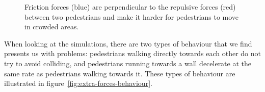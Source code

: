 \begin{figure}[hb]
    \centering
    \caption[Friction forces]{Friction forces (blue) are perpendicular to the 
    repulsive forces (red) between two pedestrians and make it harder for 
    pedestrians to move in crowded areas.}
    \label{fig:friction}
\end{figure}

When looking at the simulations, there are two types of behaviour that we find 
presents us with problems: pedestrians walking directly towards each other do 
not try to avoid colliding, and pedestrians running towards a wall decelerate 
at the same rate as pedestrians walking towards it. These types of behaviour 
are illustrated in figure~\ref{fig:extra-forces-behaviour}.

